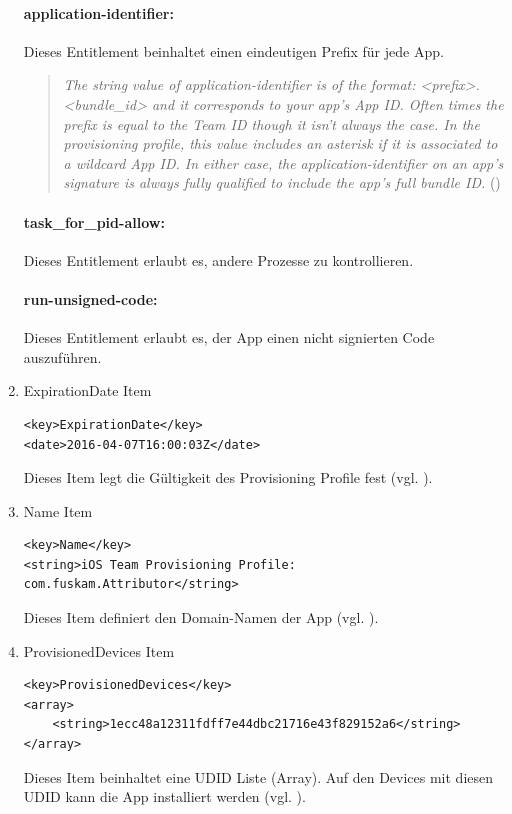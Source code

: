 \begin{enumerate}
\paragraph{application-identifier:} Dieses Entitlement beinhaltet einen eindeutigen Prefix für jede App.\par
\begin{quote}
     \glqq \textit{The string value of application-identifier is of the format: <prefix>.<bundle\_id> and it corresponds to your app's App ID. Often times the prefix is equal to the Team ID though it isn't always the case. In the provisioning profile, this value includes an asterisk if it is associated to a wildcard App ID. In either case, the application-identifier on an app's signature is always fully qualified to include the app's full bundle ID.} \grqq{} (\cite{ProvisioningProfile[3]})
\end{quote}
\paragraph{task\_for\_pid-allow:} Dieses Entitlement erlaubt es, andere Prozesse zu kontrollieren. 
\paragraph{run-unsigned-code:} Dieses Entitlement erlaubt es, der App einen nicht signierten Code auszuführen.
    \item ExpirationDate Item
\begin{lstlisting}[captionpos=b, caption={ExpirationDate Item}]
<key>ExpirationDate</key>
<date>2016-04-07T16:00:03Z</date>
\end{lstlisting}
Dieses Item legt die Gültigkeit des Provisioning Profile fest (vgl. \cite{iOSSec[5], Hacking[1]}).

    \item Name Item
\begin{lstlisting}[captionpos=b, caption={Name Item}]
<key>Name</key>
<string>iOS Team Provisioning Profile: com.fuskam.Attributor</string>
\end{lstlisting}
Dieses Item definiert den Domain-Namen der App (vgl. \cite{iOSSec[5], Hacking[1]}).

    \item ProvisionedDevices Item
\begin{lstlisting}[captionpos=b, caption={ProvisionedDevices Item}]
<key>ProvisionedDevices</key>
<array>
    <string>1ecc48a12311fdff7e44dbc21716e43f829152a6</string>
</array>
\end{lstlisting}
Dieses Item beinhaltet eine UDID Liste (Array). Auf den Devices mit diesen UDID kann die App installiert werden (vgl. \cite{iOSSec[5], Hacking[1]}).


\end{enumerate}
